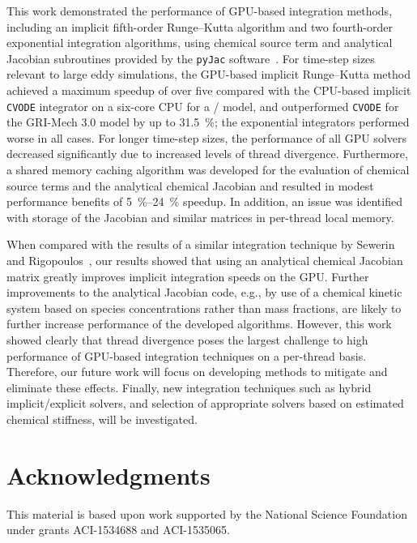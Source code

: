 \documentclass[preprint]{elsarticle}
\begin{document}
This work demonstrated the performance of GPU-based integration methods, including an implicit fifth-order Runge--Kutta algorithm and two fourth-order exponential integration algorithms, using chemical source term and analytical Jacobian subroutines provided by the \texttt{pyJac} software~\cite{Niemeyer:2015im}.
For time-step sizes relevant to large eddy simulations, the GPU-based implicit Runge--Kutta method achieved a maximum speedup of over five compared with the CPU-based implicit \texttt{CVODE} integrator on a six-core CPU for a \slash{} model, and outperformed \texttt{CVODE} for the GRI-Mech 3.0 model by up to \SI{31.5}{\percent}; the exponential integrators performed worse in all cases.
For longer time-step sizes, the performance of all GPU solvers decreased significantly due to increased levels of thread divergence.
Furthermore, a shared memory caching algorithm was developed for the evaluation of chemical source terms and the analytical chemical Jacobian and resulted in modest performance benefits of \SIrange{5}{24}{\percent} speedup.
In addition, an issue was identified with storage of the Jacobian and similar matrices in per-thread local memory.

When compared with the results of a similar integration technique by Sewerin and Rigopoulos~\cite{Sewerin20151375}, our results showed that using an analytical chemical Jacobian matrix greatly improves implicit integration speeds on the GPU.
Further improvements to the analytical Jacobian code, e.g., by use of a chemical kinetic system based on species concentrations rather than mass fractions, are likely to further increase performance of the developed algorithms.
However, this work showed clearly that thread divergence poses the largest challenge to high performance of GPU-based integration techniques on a per-thread basis.
Therefore, our future work will focus on developing methods to mitigate and eliminate these effects.
Finally, new integration techniques such as hybrid implicit\slash explicit solvers, and selection of appropriate solvers based on estimated chemical stiffness, will be investigated.


\section*{Acknowledgments}

This material is based upon work supported by the National Science Foundation under grants ACI-1534688 and ACI-1535065.



\end{document}
